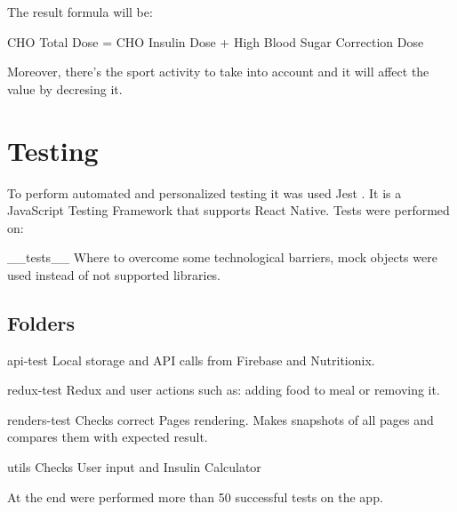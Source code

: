 \documentclass[12pt,hidelinks]{article}
\begin{document}
The result formula will be:

\begin{center} 
CHO Total Dose = CHO Insulin Dose + High Blood Sugar Correction Dose
\end{center}

Moreover, there's the sport activity to take into account and it will affect the value
by decresing it. 


\newpage
{}
\section{Testing}
\vspace{10.5cm}

To perform automated and personalized testing it was used Jest \cite{Jest}. It is a JavaScript Testing Framework that supports React Native.
Tests were performed on:
\begin{docCommand}{__tests__}{}
Where to overcome some technological barriers, mock objects were used instead of not supported libraries.
\end{docCommand}

\subsection{Folders}


\begin{docCommand}{api-test}{}
	Local storage and API calls from Firebase and Nutritionix.
\end{docCommand}

\begin{docCommand}{redux-test}{}
	Redux and user actions such as: adding food to meal or removing it. 
\end{docCommand}

\begin{docCommand}{renders-test}{}
	Checks correct Pages rendering. Makes snapshots of all pages and compares them with expected result.
\end{docCommand}

\begin{docCommand}{utils}{}
   Checks User input and Insulin Calculator 
\end{docCommand}

At the end were performed more than 50 successful tests on the app.
\end{document}
